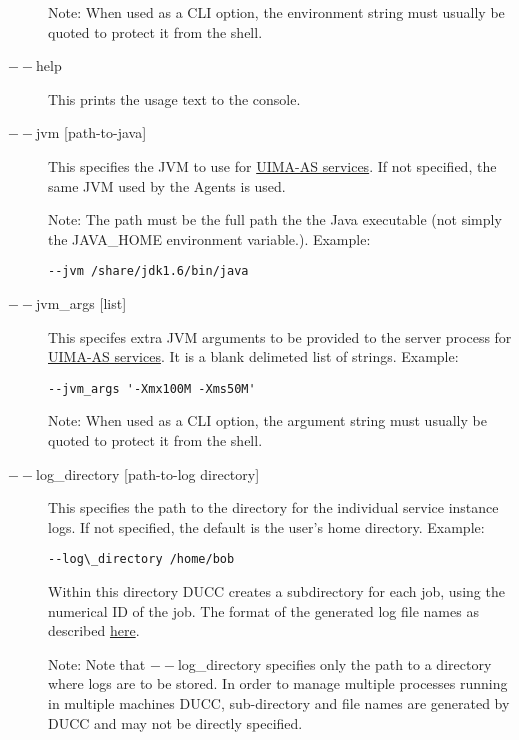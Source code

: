 \begin{description}
             Note: When used as a CLI option, the environment string must usually be
             quoted to protect it from the shell.
          
        \item[$--$help ] This prints the usage text to the console.

        \item[$--$jvm {[path-to-java]}] This specifies the JVM to use for 
          \hyperref[sec:services.types]{UIMA-AS services}. If not
          specified, the same JVM used by the Agents is used.  

          Note: The path must be the full path the the Java executable (not 
          simply the JAVA\_HOME environment variable.).  Example:
\begin{verbatim}
--jvm /share/jdk1.6/bin/java 
\end{verbatim}


        \item[$--$jvm\_args {[list]} ]        
          This specifes extra JVM arguments to be provided to the server process for
          \hyperref[sec:services.types]{UIMA-AS services}. It is a blank delimeted 
            list of strings. Example: 
\begin{verbatim}
--jvm_args '-Xmx100M -Xms50M' 
\end{verbatim}

          Note: When used as a CLI option, the argument string must usually be quoted to protect
          it from the shell.
    
          \item[$--$log\_directory {[path-to-log directory]}] This specifies the path to the directory for
            the individual service instance logs. If not specified, the default is the user's home
            directory. Example:
\begin{verbatim}
--log\_directory /home/bob 
\end{verbatim}
        
        Within this directory DUCC creates a subdirectory for each job, using the numerical 
        ID of the job. The format of the generated log file names as described
        \hyperref[chap:job-logs]{here}.
        
        Note: Note that $--$log\_directory specifies only the path to a directory where 
        logs are to be stored. In order to manage multiple processes running in multiple 
        machines DUCC, sub-directory and file names are generated by DUCC and may 
        not be directly specified. 


\end{description}
